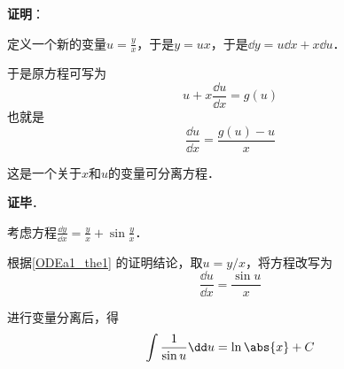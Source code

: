 \textbf{证明}：

定义一个新的变量$u=\frac{y}{x}$，于是$y=ux$，于是$\dd y=u\dd x+x\dd u$．

于是原方程可写为
\begin{equation}
u+x\frac{\dd u}{\dd x}=g(u)
\end{equation}
也就是
\begin{equation}
\frac{\dd u}{\dd x}=\frac{g(u)-u}{x}
\end{equation}

这是一个关于$x$和$u$的变量可分离方程．

\textbf{证毕}．

\begin{example}{}
考虑方程$\frac{\dd y}{\dd x}=\frac{y}{x}+\sin\frac{y}{x}$．

根据\autoref{ODEa1_the1} 的证明结论，取$u=y/x$，将方程改写为
\begin{equation}
\frac{\dd u}{\dd x}=\frac{\sin u}{x}
\end{equation}

进行变量分离后，得
\begin{equation}
\int\frac{1}{\sin u}\dd u=\ln\abs{x}+C
\end{equation}




\end{example}


















